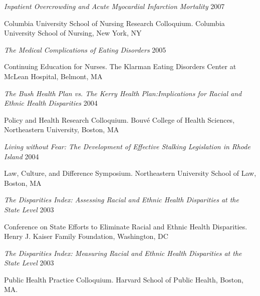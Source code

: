 \documentclass[10pt,]{article}
\begin{document}
{{{{{{{{{{{{{{{\begin{hangparas}{.5in}{1}
{\textit {Inpatient Overcrowding and Acute Myocardial Infarction Mortality}} \hfill 2007 
\vspace{-2.5mm}
\begin{adjustwidth}{0.5cm}{1cm}
Columbia University School of Nursing Research Colloquium. Columbia University School of Nursing, New York, NY
\end{adjustwidth}

{\textit {The Medical Complications of Eating Disorders}} \hfill 2005 
\vspace{-2.5mm}
\begin{adjustwidth}{0.5cm}{1cm}
Continuing Education for Nurses. The Klarman Eating Disorders Center at McLean Hospital, Belmont, MA
\end{adjustwidth}

{\textit {The Bush Health Plan vs. The Kerry Health Plan:Implications for Racial and Ethnic Health Disparities}} \hfill 2004 
\vspace{-2.5mm}
\begin{adjustwidth}{0.5cm}{1cm}
Policy and Health Research Colloquium. Bouvé College of Health Sciences, Northeastern University, Boston, MA
\end{adjustwidth}

{\textit {Living without Fear: The Development of Effective Stalking Legislation in Rhode Island}} \hfill 2004 
\vspace{-2.5mm}
\begin{adjustwidth}{0.5cm}{1cm}
Law, Culture, and Difference Symposium. Northeastern University School of Law, Boston, MA
\end{adjustwidth}

{\textit {The Disparities Index: Assessing Racial and Ethnic Health Disparities at the State Level}} \hfill 2003 
\vspace{-2.5mm}
\begin{adjustwidth}{0.5cm}{1cm}
Conference on State Efforts to Eliminate Racial and Ethnic Health Disparities. Henry J. Kaiser Family Foundation, Washington, DC
\end{adjustwidth}

{\textit {The Disparities Index: Measuring Racial and Ethnic Health Disparities at the State Level}} \hfill 2003 
\vspace{-2.5mm}
\begin{adjustwidth}{0.5cm}{1cm}
Public Health Practice Colloquium. Harvard School of Public Health, Boston, MA.
\end{adjustwidth}


\end{hangparas}}}}}}}}}}}}}}}}
\end{document}
